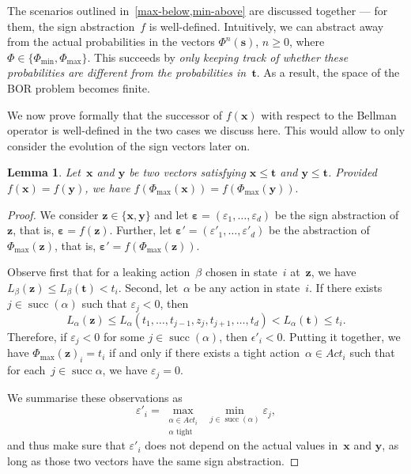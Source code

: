 \documentclass[preprint,12pt]{elsarticle}
\theoremstyle{plain}
\newtheorem{lemma}[theorem]{Lemma}
\theoremstyle{definition}
\theoremstyle{remark}
\theoremstyle{claimstyle}
\newcommand{\eps}{\bm{\varepsilon}}
\DeclareMathOperator*{\suc}{succ}
\begin{document}
The scenarios outlined in~\cref{max-below,min-above} are discussed together 
--- for them, the sign abstraction~$f$ is well-defined.
Intuitively, we can abstract away from the actual probabilities in the vectors $\Phi^n(\bm{s})$, $n \geq 0$, where $\Phi \in \{\Phi_{\min}, \Phi_{\max}\}$. This succeeds by \emph{only keeping track of whether these probabilities are different from the probabilities in~$\bm{t}$}.
As a result, the space of the BOR problem becomes finite.


We now prove formally that the successor of $f(\bm{x})$ with respect to the Bellman operator is well-defined in the two cases we discuss here.
This would allow to only consider the evolution of the sign vectors later on.

\begin{lemma}\label{phi-below}
Let~$\bm{x}$ and $\bm{y}$ be two vectors satisfying $\bm{x} \leq \bm{t}$ and $\bm{y} \leq \bm{t}$. 
Provided $f(\bm{x}) = f(\bm{y})$, we have
\(f(\Phi_{\max}(\bm{x})) = f(\Phi_{\max}(\bm{y})).\)
\end{lemma}
\begin{proof}
	We consider $\bm{z} \in \{\bm{x},\bm{y}\}$ and let $\eps = (\varepsilon_1, \dots, \varepsilon_d)$ be the sign abstraction of~$\bm{z}$, that is, $\eps = f(\bm{z})$.
	Further, let $\eps' = (\varepsilon'_1, \dots, \varepsilon'_d)$ be the abstraction of~$\Phi_{\max}(\bm{z})$, that is, $\eps' = f(\Phi_{\max}(\bm{z}))$.
	
	Observe first that for a leaking action~$\beta$ chosen in state~$i$ at~$\bm{z}$, we have $L_\beta(\bm{z}) \leq L_\beta(\bm{t}) < t_i$.
Second, let~$\alpha$ be any action in state~$i$. If there exists $j \in \suc(\alpha)$ such that $\varepsilon_j < 0$,
then 
\[L_\alpha(\bm{z}) \leq L_{\alpha}(t_1, \dots, t_{j-1}, z_j, t_{j+1}, \dots, t_d) < L_{\alpha}(\bm{t}) \leq t_i.\]
Therefore, if  $\varepsilon_j < 0$ for some $j \in \suc(\alpha)$, then
$\epsilon'_i < 0$.
Putting it together, we have $\Phi_{\max}(\bm{z})_i = t_i$ if and only if
there exists a tight action~$\alpha \in Act_i$ 
such that for each~$j \in \suc{\alpha}$, we have $\varepsilon_j = 0$.

We summarise these observations as 
\begin{equation}\label{eq:phi-below}
	\varepsilon'_i = \max_{\substack{\alpha \in Act_i \\ \alpha \text{ tight}}} \; \min_{j \in \suc(\alpha)} \varepsilon_j,
\end{equation}
and thus make sure that $\varepsilon'_i$ does not depend on the actual values in~$\bm{x}$ and $\bm{y}$, as long as those two vectors have the same sign abstraction.
\end{proof}
\end{document}
